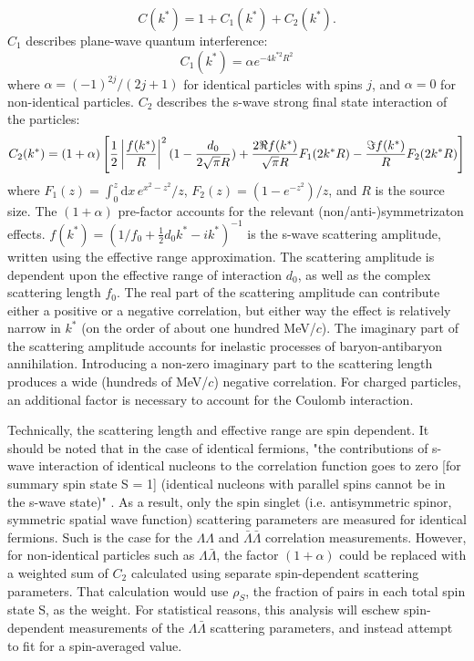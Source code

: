 \begin{equation}
C(k^*)= 1 + C_1(k^*)+C_2(k^*).
\end{equation}
$C_1$ describes plane-wave quantum interference:
\begin{equation}
C_1(k^*) = \alpha e^{-4k^{*2}R^2}
\end{equation}
where $\alpha = (-1)^{2j}/(2j+1)$ for identical particles with spins $j$, and $\alpha = 0$ for non-identical particles.  $C_2$ describes the s-wave strong final state interaction of the particles:
\begin{equation}
\label{eq:Lednicky}
C_2(k^*)= (1+\alpha)\left[\frac{1}{2}\left\lvert\frac{f(k^*)}{R}\right\rvert^2(1-\frac{d_0}{2\sqrt{\pi}R})+\frac{2\Re f(k^*)}{\sqrt{\pi}R}F_1(2k^*R)-\frac{\Im f(k^*)}{R}F_2(2k^*R)\right]
\end{equation}
where $F_1(z) = \int_0^z \! \mathrm{d}x \, e^{x^2-z^2}/z$,  $F_2(z) = (1-e^{-z^2})/z$, and $R$ is the source size. The $(1+\alpha)$ pre-factor accounts for the relevant (non/anti-)symmetrizaton effects.  $f(k^*)=(1/f_0+\frac{1}{2}d_0k^*-ik^*)^{-1}$ is the s-wave scattering amplitude, written using the effective range approximation.  The scattering amplitude is dependent upon the effective range of interaction $d_0$, as well as the complex scattering length $f_0$.  The real part of the scattering amplitude can contribute either a positive or a negative correlation, but either way the effect is relatively narrow in $k^*$ (on the order of about one hundred MeV/$c$).  The imaginary part of the scattering amplitude accounts for inelastic processes of baryon-antibaryon annihilation.  Introducing a non-zero imaginary part to the scattering length produces a wide (hundreds of MeV/$c$) negative correlation.  For charged particles, an additional factor \cite{Aamodt:2011kd} is necessary to account for the Coulomb interaction.

Technically, the scattering length and effective range are spin dependent.  It should be noted that in the case of identical fermions, "the contributions of s-wave interaction of identical nucleons to the correlation function goes to zero [for summary spin state S = 1] (identical nucleons with parallel spins cannot be in the s-wave state)" \cite{lednicky82}.  As a result, only the spin singlet (i.e. antisymmetric spinor, symmetric spatial wave function) scattering parameters are measured for identical fermions.  Such is the case for the $\Lambda\Lambda$ and $\bar{\Lambda}\bar{\Lambda}$ correlation measurements.  However, for non-identical particles such as $\Lambda\bar{\Lambda}$, the factor $(1+\alpha)$ could be replaced with a weighted sum of $C_2$ calculated using separate spin-dependent scattering parameters.  That calculation would use $\rho_S$, the fraction of pairs in each total spin state S, as the weight.  For statistical reasons, this analysis will eschew spin-dependent measurements of the $\Lambda\bar{\Lambda}$ scattering parameters, and instead attempt to fit for a spin-averaged value.


